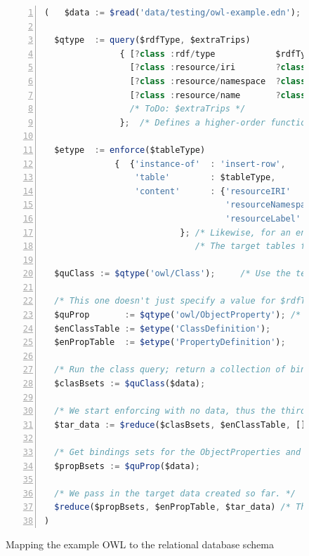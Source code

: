 \documentclass[10pt,letterpaper]{article} %
\begin{document}
\begin{figure}[H]
  \caption{Mapping the example OWL to the relational database schema}
  \label{code:mapping-owl-to-rdbms}
\begin{lstlisting}[language=JavaScript,numberstyle=\scriptsize,basicstyle=\ttfamily\scriptsize,numbers=left,stepnumber=1,breaklines=true]
  (   $data := $read('data/testing/owl-example.edn');

  $qtype  := query($rdfType, $extraTrips)
               { [?class :rdf/type            $rdfType]
                 [?class :resource/iri        ?class-iri]
                 [?class :resource/namespace  ?class-ns]
                 [?class :resource/name       ?class-name]
                 /* ToDo: $extraTrips */
               };  /* Defines a higher-order function, a template of sorts. */

  $etype  := enforce($tableType)
              {  {'instance-of'  : 'insert-row',
                  'table'        : $tableType,
                  'content'      : {'resourceIRI'       : ?class-iri,
                                    'resourceNamespace' : ?class-ns,
                                    'resourceLabel'     : ?class-name}}
                           }; /* Likewise, for an enforce template. */
                              /* The target tables for objects and relations a very similar. */

  $quClass := $qtype('owl/Class');     /* Use the template, here and the next three assignments. */

  /* This one doesn't just specify a value for $rdfType, but for $extraTrips. */
  $quProp       := $qtype('owl/ObjectProperty'); /* ToDo: ,queryTriples{[?class :rdfs/domain ?domain] [?class :rdfs/range ?range]}); */
  $enClassTable := $etype('ClassDefinition');
  $enPropTable  := $etype('PropertyDefinition');

  /* Run the class query; return a collection of binding sets about classes. */
  $clasBsets := $quClass($data);

  /* We start enforcing with no data, thus the third argument is []. */
  $tar_data := $reduce($clasBsets, $enClassTable, []);

  /* Get bindings sets for the ObjectProperties and make similar tables. */
  $propBsets := $quProp($data);

  /* We pass in the target data created so far. */
  $reduce($propBsets, $enPropTable, $tar_data) /* The code block returns the target data. */
)
\end{lstlisting}
\end{figure}
\end{document}
